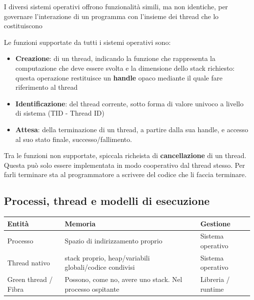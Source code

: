 I diversi sistemi operativi offrono funzionalità simili, ma non identiche, per
governare l'interazione di un programma con l'insieme dei thread che lo
costituiscono

Le funzioni supportate da tutti i sistemi operativi sono:

\begin{itemize}
  \item \textbf{Creazione}: di un thread, indicando la funzione che
        rappresenta la computazione che deve essere svolta e la dimensione dello stack
        richiesto: questa operazione restituisce un \textbf{handle} opaco mediante il quale
        fare riferimento al thread
  \item \textbf{Identificazione}: del thread corrente, sotto forma di valore
        univoco a livello di sistema (TID - Thread ID)
  \item \textbf{Attesa}: della terminazione di un thread, a partire dalla sua
        handle, e accesso al suo stato finale, successo/fallimento.
\end{itemize}

Tra le funzioni non supportate, spiccala richeista di \textbf{cancellazione} di un thread.
Questa può solo essere implementata in modo cooperativo dal thread stesso.
Per farli terminare sta al programmatore a scrivere del codice che li faccia
terminare.

\subsection{Processi, thread e modelli di esecuzione}

\begin{table}[h!]
  \renewcommand{\arraystretch}{1.5}
  \centering
  \begin{tabularx}{\textwidth}{l l l}
    \toprule
    \textbf{Entità}      & \textbf{Memoria}                                          & \textbf{Gestione}  \\
    \midrule
    Processo             & Spazio di indirizzamento proprio                          & Sistema operativo  \\
    Thread nativo        & stack proprio, heap/variabili globali/codice condivisi    & Sistema operativo  \\
    Green thread / Fibra & Possono, come no, avere uno stack. Nel processo ospitante & Libreria / runtime \\
    \bottomrule
  \end{tabularx}
\end{table}

